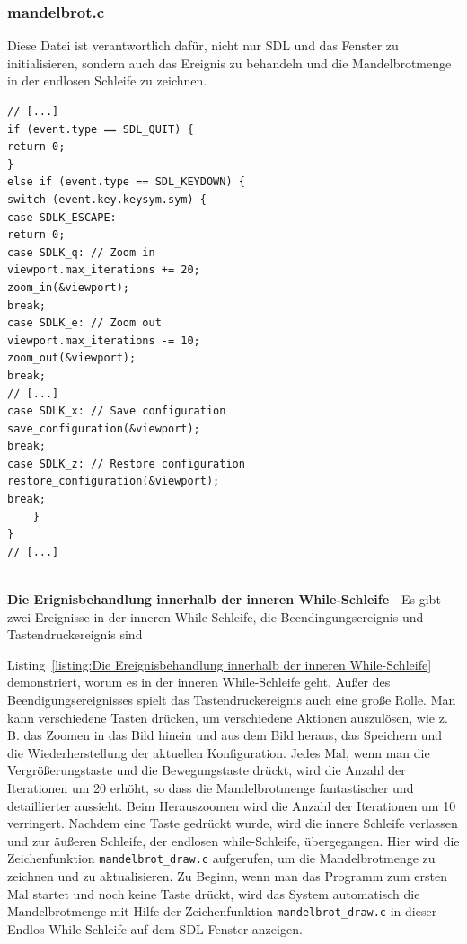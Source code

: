 \documentclass[ngerman,12pt,a4paper,titlepage]{article}
\begin{document}
\subsubsection{mandelbrot.c}
\begin{sloppypar}
Diese Datei ist verantwortlich dafür, nicht nur SDL und das Fenster zu initialisieren, sondern auch das Ereignis zu behandeln und die Mandelbrotmenge in der endlosen Schleife zu zeichnen.

\begin{listing}[H]
	\begin{verbatim}
// [...]
if (event.type == SDL_QUIT) {
return 0;
}
else if (event.type == SDL_KEYDOWN) {
switch (event.key.keysym.sym) {
case SDLK_ESCAPE:
return 0;
case SDLK_q: // Zoom in
viewport.max_iterations += 20;
zoom_in(&viewport);
break;
case SDLK_e: // Zoom out
viewport.max_iterations -= 10;
zoom_out(&viewport);
break;
// [...]
case SDLK_x: // Save configuration
save_configuration(&viewport);
break;
case SDLK_z: // Restore configuration
restore_configuration(&viewport);
break;
	}
}
// [...]
		
	\end{verbatim}
	\caption[\textbf{Die Ereignisbehandlung innerhalb der inneren While-Schleife}]{\textbf{Die Erignisbehandlung innerhalb der inneren While-Schleife} - Es gibt zwei Ereignisse in der inneren While-Schleife, die Beendingungsereignis und Tastendruckereignis sind}
	\label{listing:Die Ereignisbehandlung innerhalb der inneren While-Schleife}
\end{listing}

Listing~\ref{listing:Die Ereignisbehandlung innerhalb der inneren While-Schleife} demonstriert, worum es in der inneren While-Schleife geht. Außer des Beendigungsereignisses spielt das Tastendruckereignis auch eine große Rolle. Man kann verschiedene Tasten drücken, um verschiedene Aktionen auszulösen, wie z. B. das Zoomen in das Bild hinein und aus dem Bild heraus, das Speichern und die Wiederherstellung der aktuellen Konfiguration. Jedes Mal, wenn man die Vergrößerungstaste und die Bewegungstaste drückt, wird die Anzahl der Iterationen um 20 erhöht, so dass die Mandelbrotmenge fantastischer und detaillierter aussieht. Beim Herauszoomen wird die Anzahl der Iterationen um 10 verringert. Nachdem eine Taste gedrückt wurde, wird die innere Schleife verlassen und zur äußeren Schleife, der endlosen while-Schleife, übergegangen. Hier wird die Zeichenfunktion \texttt{mandelbrot\_draw.c} aufgerufen, um die Mandelbrotmenge zu zeichnen und zu aktualisieren. Zu Beginn, wenn man das Programm zum ersten Mal startet und noch keine Taste drückt, wird das System automatisch die Mandelbrotmenge mit Hilfe der Zeichenfunktion \texttt{mandelbrot\_draw.c} in dieser Endlos-While-Schleife auf dem SDL-Fenster anzeigen.
\end{sloppypar}
\end{document}
